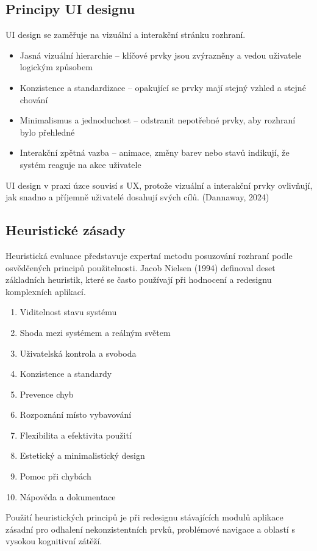 \subsection{Principy UI designu}
UI design se zaměřuje na vizuální a interakční stránku rozhraní.
\begin{itemize}
    \item Jasná vizuální hierarchie – klíčové prvky jsou zvýrazněny a vedou uživatele logickým způsobem
    \item Konzistence a standardizace – opakující se prvky mají stejný vzhled a stejné chování
    \item Minimalismus a jednoduchost – odstranit nepotřebné prvky, aby rozhraní bylo přehledné
    \item Interakční zpětná vazba – animace, změny barev nebo stavů indikují, že systém reaguje na akce uživatele
\end{itemize}
UI design v praxi úzce souvisí s UX, protože vizuální a interakční prvky ovlivňují, jak snadno a příjemně uživatelé dosahují svých cílů. (Dannaway, 2024)

\subsection{Heuristické zásady}
Heuristická evaluace představuje expertní metodu posuzování rozhraní podle osvědčených principů použitelnosti. Jacob Nielsen (1994) definoval deset základních heuristik, které se často používají při hodnocení a redesignu komplexních aplikací.
\begin{enumerate}
    \item Viditelnost stavu systému
    \item Shoda mezi systémem a reálným světem
    \item Uživatelská kontrola a svoboda
    \item Konzistence a standardy
    \item Prevence chyb
    \item Rozpoznání místo vybavování
    \item Flexibilita a efektivita použití
    \item Estetický a minimalistický design
    \item Pomoc při chybách
    \item Nápověda a dokumentace
\end{enumerate}
Použití heuristických principů je při redesignu stávajících modulů aplikace zásadní pro odhalení nekonzistentních prvků, problémové navigace a oblastí s vysokou kognitivní zátěží.

